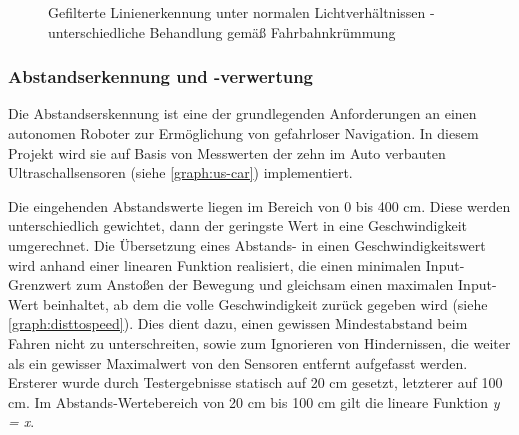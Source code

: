 \documentclass[12pt, a4paper]{scrartcl}
\begin{document}
\begin{figure}
	\caption{Gefilterte Linienerkennung unter normalen Lichtverhältnissen - unterschiedliche Behandlung gemäß Fahrbahnkrümmung}
	\label{img:line_filt_normal_u_kurve}
\end{figure}


\subsubsection{Abstandserkennung und -verwertung}
Die Abstandserskennung ist eine der grundlegenden Anforderungen an einen autonomen Roboter zur Ermöglichung von gefahrloser Navigation. In diesem Projekt wird sie auf Basis von Messwerten der zehn im Auto verbauten Ultraschallsensoren (siehe \autoref{graph:us-car})  implementiert.

Die eingehenden Abstandswerte liegen im Bereich von 0 bis 400 cm. Diese werden unterschiedlich gewichtet, dann der geringste Wert in eine Geschwindigkeit umgerechnet. Die Übersetzung eines Abstands- in einen Geschwindigkeitswert wird anhand einer linearen Funktion realisiert, die einen minimalen  Input-Grenzwert zum Anstoßen der Bewegung und gleichsam einen maximalen Input-Wert beinhaltet, ab dem die volle Geschwindigkeit zurück gegeben wird (siehe \autoref{graph:disttospeed}). Dies dient dazu, einen gewissen Mindestabstand beim Fahren nicht zu unterschreiten, sowie zum Ignorieren von Hindernissen, die weiter als ein gewisser Maximalwert von den Sensoren entfernt aufgefasst werden. Ersterer wurde durch Testergebnisse statisch auf 20 cm gesetzt, letzterer auf 100 cm. Im Abstands-Wertebereich von 20 cm bis 100 cm gilt die lineare Funktion \emph{y = x}.
\end{document}
